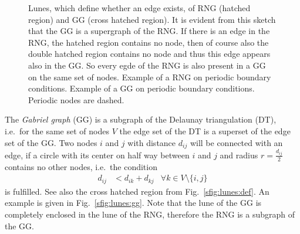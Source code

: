     \begin{figure}[htbp]
        \centering
        \caption[Gabriel and Relative Neighborhood Graph]
        {
             Lunes, which define whether an edge
                exists, of RNG (hatched region) and GG (cross hatched region).
                It is evident from this sketch that the GG is a supergraph
                of the RNG. If there is an edge in the RNG, the hatched
                region contains no node, then of course also the double
                hatched region contains no node and thus this edge appears
                also in the GG. So every egde of the RNG is also present
                in a GG on the same set of nodes.
             Example of a RNG on periodic
                boundary conditions.
             Example of a GG on
                periodic boundary conditions. Periodic nodes are dashed.
        }
        \label{fig:lunes}
    \end{figure}

    The \emph{Gabriel graph} (GG) \cite{Gabriel1969} is a subgraph
    of the Delaunay triangulation \cite{Delaunay1934,Katajainen}
    (DT), i.e.~for the same set of nodes \(V\) the edge set of the
    DT is a superset of the edge set of the GG. Two nodes \(i\) and
    \(j\) with distance \(d_{ij}\) will be connected with an edge,
    if a circle with its center on half way between \(i\) and \(j\)
    and radius \(r = \frac{d_{ij}}{2}\) contains no other nodes, i.e.~the
    condition
    \begin{align*}
        d_{ij} &< d_{ik} + d_{kj} &\forall k \in V\setminus\{i,j\}
    \end{align*}
    is fulfilled. See
    also the cross hatched region from Fig.~\ref{sfig:lunes:def}. An
    example is given in Fig.~\ref {sfig:lunes:gg}. Note that the
    lune of the GG is completely enclosed in the lune of the RNG,
    therefore the RNG is a subgraph of the GG.

